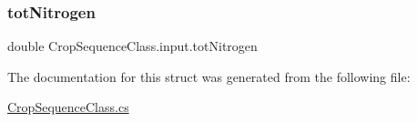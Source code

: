\subsubsection{\texorpdfstring{totNitrogen}{totNitrogen}}
{\footnotesize\ttfamily double Crop\+Sequence\+Class.\+input.\+tot\+Nitrogen}



The documentation for this struct was generated from the following file\+:\begin{DoxyCompactItemize}
\item 
\mbox{\hyperlink{_crop_sequence_class_8cs}{Crop\+Sequence\+Class.\+cs}}\end{DoxyCompactItemize}
